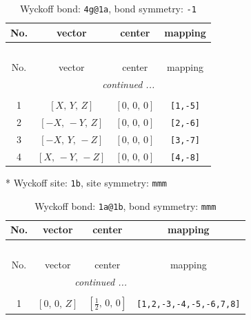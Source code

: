 \documentclass[fleqn,8pt]{jsarticle}
\begin{document}
\begin{longtable}{cccc}
\caption{Wyckoff bond: {\tt 4g@1a}, bond symmetry: {\tt -1}}
 \\
 \hline \hline
No. & vector & center & mapping \\ \hline \endfirsthead

\multicolumn{3}{l}{\tablename\ \thetable{}} \\
 \hline \hline
No. & vector & center & mapping \\ \hline \endhead

 \hline \hline
\multicolumn{3}{r}{\footnotesize\it continued ...} \\ \endfoot

 \hline \hline
\multicolumn{3}{r}{} \\ \endlastfoot

1 & $\left[ X,\, Y,\, Z \right]$ & $\left[ 0,\, 0,\, 0 \right]$ & {\tt [1,-5]} \\ \hline
2 & $\left[ - X,\, - Y,\, Z \right]$ & $\left[ 0,\, 0,\, 0 \right]$ & {\tt [2,-6]} \\ \hline
3 & $\left[ - X,\, Y,\, - Z \right]$ & $\left[ 0,\, 0,\, 0 \right]$ & {\tt [3,-7]} \\ \hline
4 & $\left[ X,\, - Y,\, - Z \right]$ & $\left[ 0,\, 0,\, 0 \right]$ & {\tt [4,-8]} \\
\end{longtable}
* Wyckoff site: {\tt 1b}, site symmetry: {\tt mmm}
\renewcommand{\arraystretch}{1.2}
\begin{longtable}{cccc}
\caption{Wyckoff bond: {\tt 1a@1b}, bond symmetry: {\tt mmm}}
 \\
 \hline \hline
No. & vector & center & mapping \\ \hline \endfirsthead

\multicolumn{3}{l}{\tablename\ \thetable{}} \\
 \hline \hline
No. & vector & center & mapping \\ \hline \endhead

 \hline \hline
\multicolumn{3}{r}{\footnotesize\it continued ...} \\ \endfoot

 \hline \hline
\multicolumn{3}{r}{} \\ \endlastfoot

1 & $\left[ 0,\, 0,\, Z \right]$ & $\left[ \frac{1}{2},\, 0,\, 0 \right]$ & {\tt [1,2,-3,-4,-5,-6,7,8]} \\
\end{longtable}
\renewcommand{\arraystretch}{1.2}
\end{document}
